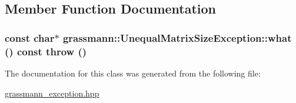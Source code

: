 \subsection{Member Function Documentation}
\hypertarget{classgrassmann_1_1UnequalMatrixSizeException_06af655bdb0f47e75bbc6e4a72aad530}{
\subsubsection[what]{\setlength{\rightskip}{0pt plus 5cm}const char$\ast$ grassmann::UnequalMatrixSizeException::what () const  throw ()}}
\label{classgrassmann_1_1UnequalMatrixSizeException_06af655bdb0f47e75bbc6e4a72aad530}




The documentation for this class was generated from the following file:\begin{CompactItemize}
\item 
\hyperlink{grassmann__exception_8hpp}{grassmann\_\-exception.hpp}\end{CompactItemize}
